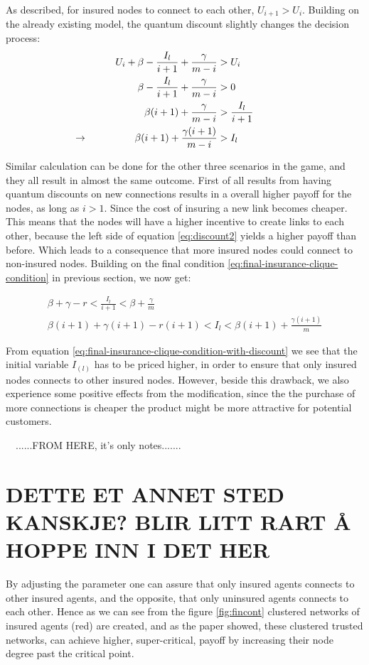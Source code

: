 As described, for insured nodes to connect to each other, $U_{i+1} > U_{i}$. Building on the already existing model, the quantum discount slightly changes the decision process:
\begin{eqnarray}
U_{i}+\beta-\frac{I_{l}}{i+1}+\frac{\gamma}{m-i}&>U_{i} \nonumber \\ 
\beta-\frac{I_{l}}{i+1}+\frac{\gamma}{m-i}&>0 \nonumber \\ 
\beta (i+1)+\frac{\gamma}{m-i}&>\frac{I_{l}}{i+1} \nonumber \\
\llap{$\rightarrow$\hspace{50pt}}  \beta (i+1)+\frac{\gamma (i+1)}{m-i}&>I_{l}
\label{eq:discount2}
\end{eqnarray}

Similar calculation can be done for the other three scenarios in the game, and they all result in almost the same outcome. First of all results from having quantum discounts on new connections results in a overall higher payoff for the nodes, as long as $i>1$. Since the cost of insuring a new link becomes cheaper. This means that the nodes will have a higher incentive to create links to each other, because the left side of equation \ref{eq:discount2} yields a higher payoff than before. Which leads to a consequence that more insured nodes could connect to non-insured nodes. 
Building on the final condition \ref{eq:final-insurance-clique-condition} in previous section, we now get:

\begin{eqnarray}
\beta+\gamma-r<\frac{I_{l}}{i+1}<\beta+\frac{\gamma}{m} \nonumber \\
\beta(i+1)+\gamma(i+1)-r(i+1)<I_{l}<\beta(i+1)+\frac{\gamma(i+1)}{m}
\label{eq:final-insurance-clique-condition-with-discount}
\end{eqnarray}


From equation \ref{eq:final-insurance-clique-condition-with-discount} we see that the initial variable $I_(l)$ has to be priced higher, in order to ensure that only insured nodes connects to other insured nodes. However, beside this drawback, we also experience some positive effects from the modification, since the the purchase of more connections is cheaper the product might be more attractive for potential customers. 







\
\
......FROM HERE, it's only notes.......
\section{DETTE ET ANNET STED KANSKJE? BLIR LITT RART Å HOPPE INN I DET HER}
By adjusting the parameter one can assure that only insured agents connects to other insured agents, and the opposite,
that only uninsured agents connects to each other. Hence as we can see from the figure \ref{fig:fincont} clustered
networks of insured agents (red) are created, and  as the paper \cite{contagion} showed, these clustered trusted
networks, can achieve higher, super-critical, payoff by increasing their node degree past the critical point.

